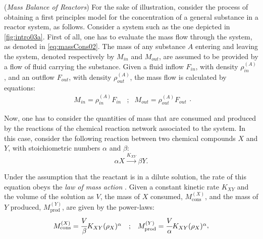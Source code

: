 \documentclass[a4paper,11pt]{book}
\numberwithin{figure}{chapter}
\numberwithin{equation}{chapter}
\numberwithin{table}{chapter}
\theoremstyle{definition}
\newtheorem{example}{Example}[chapter]
\newcounter{boxed-theorem}
\newcounter{boxed-definition}
\newcounter{boxed-example}
\newenvironment{boxed-example}[1]
{\colorlet{shadecolor}{pastelRed!20} \begin{shaded} \begin{example}{#1}}
{\end{example} \end{shaded}}
\begin{document}
\begin{boxed-example}{(\textit{Mass Balance of Reactors})} \label{ex:isoReactSys01}
    For the sake of illustration, consider the process of obtaining a first principles model for the concentration of a general substance in a reactor system, as follows. Consider a system such as the one depicted in \ref{fig:intro03a}. First of all, one has to evaluate the mass flow through the system, as denoted in \eqref{eq:massCons02}. The mass of any substance $A$ entering and leaving the system, denoted respectively by $M_{in}$ and $M_{out}$, are assumed to be provided by a flow of fluid carrying the substance. Given a fluid inflow $F_{in}$, with density $\rho^{(A)}_{in}$, and an outflow $F_{out}$, with density $\rho^{(A)}_{out}$, the mass flow is calculated by equations:
    \begin{equation}
        \begin{matrix}
            M_{in} = \rho^{(A)}_{in} F_{in} &; & M_{out} = \rho^{(A)}_{out} F_{out}
        \end{matrix}
    .\end{equation}
    
    Now, one has to consider the quantities of mass that are consumed and produced by the reactions of the chemical reaction network associated to the system. In this case, consider the following reaction between two chemical compounds $X$ and $Y$, with stoichiometric numbers $\alpha$ and $\beta$:
    \begin{equation} \label{eq:simpleEq01}
        \alpha X \overset{K_{XY}}{\longrightarrow} \beta Y
    .\end{equation}
    
    Under the assumption that the reactant is in a dilute solution, the rate of this equation obeys the \textit{law of mass action} \cite{Horn:1972}. Given a constant kinetic rate $K_{XY}$ and the volume of the solution as $V$, the mass of $X$ consumed, $M^{(X)}_\text{cons}$, and the mass of $Y$ produced, $M^{(Y)}_\text{prod}$, are given by the power-laws:
    \begin{equation}
        \begin{matrix}
            M^{(X)}_\text{cons} = \cfrac{V}{\beta} K_{XY} (\rho_X)^{\alpha} &; & M^{(Y)}_\text{prod} = \cfrac{V}{\alpha} K_{XY} (\rho_X)^{\alpha}
        \end{matrix}
    ,\end{equation}
    

\end{boxed-example}
\end{document}
